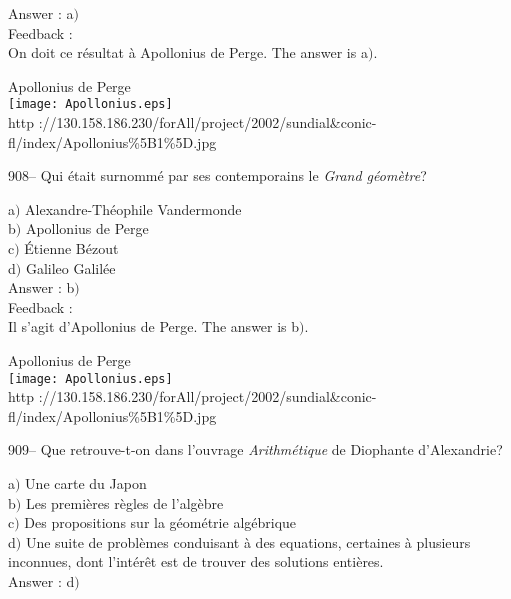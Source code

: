 \documentclass[letterpaper, 12pt]{article}
\begin{document}
Answer : a$)$\\

Feedback : \\
On doit ce r\'esultat \`a Apollonius de Perge. The answer is a$)$.\\

        \begin{center}
        Apollonius de Perge\\
    \texttt{[image: Apollonius.eps]}\\
        {\footnotesize http
://130.158.186.230/forAll/project/2002/sundial\&conic-fl/index/Apollonius\%5B1\%5D.jpg}
    \end{center}

908-- Qui \'etait surnomm\'e par ses contemporains le {\sl Grand
g\'eom\`etre}?

a$)$ Alexandre-Th\'eophile Vandermonde \\
b$)$ Apollonius de Perge \\
c$)$ \'Etienne B\'ezout \\
d$)$ Galileo Galil\'ee \\

Answer : b$)$\\

Feedback : \\
Il s'agit d'Apollonius de Perge. The answer is b$)$.\\

        \begin{center}
        Apollonius de Perge\\
    \texttt{[image: Apollonius.eps]}\\
        {\footnotesize http
://130.158.186.230/forAll/project/2002/sundial\&conic-fl/index/Apollonius\%5B1\%5D.jpg}
    \end{center}

909-- Que retrouve-t-on dans l'ouvrage {\sl Arithm\'etique} de
Diophante d'Alexandrie?

a$)$ Une carte du Japon \\
b$)$ Les premi\`eres r\`egles de l'alg\`ebre \\
c$)$ Des propositions sur la g\'eom\'etrie alg\'ebrique \\
d$)$ Une suite de probl\`emes conduisant \`a des equations, certaines \`a
plusieurs inconnues,
dont l'int\'er\^et est de trouver des solutions enti\`eres.\\

Answer : d$)$\\
\end{document}
